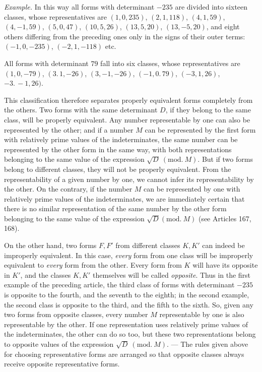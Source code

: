 \textit{Example.} In this way all forms with determinant $-235$ are divided into sixteen classes, whose representatives are $(1,0,235)$, $(2,1,118)$, $(4,1,59)$, $(4,-1,59)$, $(5,0,47)$, $(10,5,26)$, $(13,5,20)$, $(13,-5,20)$, and eight others differing from the preceding ones only in the signs of their outer terms: $(-1,0,-235)$, $(-2,1,-118)$ etc.

All forms with determinant $79$ fall into six classes, whose representatives are $(1,0,-79)$, $(3.\,1,-26)$, $(3,-1,-26)$, $(-1,0.\,79)$, $(-3,1,26)$, $-3.\,-1,26)$.

This classification therefore separates properly equivalent forms completely from the others. Two forms with the same determinant $D$, if they belong to the same class, will be properly equivalent. Any number representable by one can also be represented by the other; and if a number $M$ can be represented by the first form with relatively prime values of the indeterminates, the same number can be represented by the other form in the same way, with both representations belonging to the same value of the expression $\sqrt{D}\ (\mathrm{mod.}\ M)$. But if two forms belong to different classes, they will not be properly equivalent. From the representability of a given number by one, we cannot infer its representability by the other. On the contrary, if the number $M$ can be represented by one with relatively prime values of the indeterminates, we are immediately certain that there is no similar representation of the same number by the other form belonging to the same value of the expression $\sqrt{D}(\mathrm{mod.}\ M)$ (see Articles 167, 168).

On the other hand, two forms $F,F'$ from different classes $K,K'$ can indeed be improperly equivalent. In this case, \textit{every} form from one class will be improperly equivalent to \textit{every} form from the other. Every form from $K$ will have its opposite in $K'$, and the classes $K,K'$ themselves will be called \textit{opposite}. Thus in the first example of the preceding article, the third class of forms with determinant $-235$ is opposite to the fourth, and the seventh to the eighth; in the second example, the second class is opposite to the third, and the fifth to the sixth. So, given any two forms from opposite classes, every number $M$ representable by one is also representable by the other. If one representation uses relatively prime values of the indeterminates, the other can do so too, but these two representations belong to opposite values of the expression $\sqrt{D}\ (\mathrm{mod.}\ M)$. --- The rules given above for choosing representative forms are arranged so that opposite classes always receive opposite representative forms.

